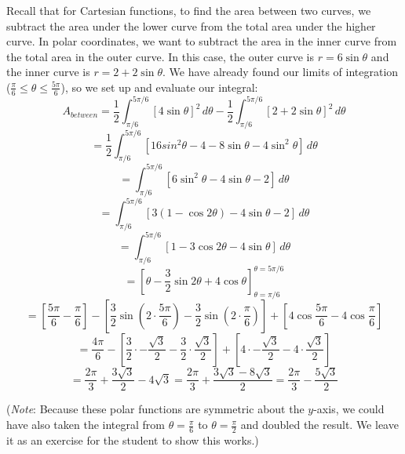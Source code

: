 Recall that for Cartesian functions, to find the area between two curves, we 
subtract the area under the lower curve from the total area under the higher 
curve. In polar coordinates, we want to subtract the area in the inner curve 
from the total area in the outer curve. In this case, the outer curve is $r = 
6\sin{\theta}$ and the inner curve is $r = 2 + 2\sin{\theta}$. We have already 
found our limits of integration ($\frac{\pi}{6} \leq \theta \leq \frac{5 \pi}{
6}$), so we set up and evaluate our integral:
$$A_{between} = \frac{1}{2} \int_{\pi / 6}^{5 \pi / 6} \left[ 4 \sin{\theta} 
\right]^2\,d\theta - \frac{1}{2} \int_{\pi / 6}^{5 \pi / 6} \left[ 2 + 2 \sin{
\theta} \right]^2\,d\theta$$
$$= \frac{1}{2} \int_{\pi / 6}^{5 \pi / 6} \left[ 16 sin^2{\theta} - 4 - 8 
\sin{\theta} - 4 \sin^2{\theta} \right] \, d\theta$$
$$= \int_{\pi / 6}^{5 \pi / 6} \left[ 6 \sin^2{\theta} - 4\sin{\theta} - 2 
\right]\, d\theta$$
$$= \int_{\pi / 6}^{5 \pi / 6} \left[ 3 \left( 1 - \cos{2\theta} \right) - 4
\sin{\theta} - 2 \right] \, d\theta$$
$$= \int_{\pi / 6}^{5 \pi / 6} \left[ 1 - 3\cos{2\theta} - 4\sin{\theta} 
\right] \, d\theta$$
$$= \left[ \theta - \frac{3}{2}\sin{2\theta} + 4\cos{\theta} \right]_{\theta = 
\pi / 6}^{\theta = 5 \pi / 6}$$
$$= \left[ \frac{5\pi}{6} - \frac{\pi}{6} \right] - \left[ \frac{3}{2} \sin{
\left( 2 \cdot \frac{5\pi}{6} \right)} - \frac{3}{2} \sin{\left( 2 \cdot \frac{
\pi}{6} \right)} \right] + \left[ 4\cos{\frac{5\pi}{6}} - 4\cos{\frac{\pi}{6}} 
\right]$$
$$= \frac{4\pi}{6} - \left[ \frac{3}{2} \cdot -\frac{\sqrt{3}}{2} - \frac{3}{2}
\cdot \frac{\sqrt{3}}{2} \right] + \left[ 4 \cdot -\frac{\sqrt{3}}{2} - 4 \cdot
\frac{\sqrt{3}}{2} \right]$$
$$= \frac{2\pi}{3} + \frac{3\sqrt{3}}{2} - 4\sqrt{3} = \frac{2\pi}{3} + \frac{3
\sqrt{3} - 8\sqrt{3}}{2} = \frac{2\pi}{3} - \frac{5\sqrt{3}}{2}$$

(\textit{Note}: Because these polar functions are symmetric about the $y$-axis,
we could have also taken the integral from $\theta = \frac{\pi}{6}$ to $\theta 
= \frac{\pi}{2}$ and doubled the result. We leave it as an exercise for the 
student to show this works.)

